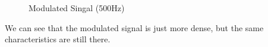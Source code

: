 \documentclass[12pt]{article}
\begin{document}
\begin{figure}[H]
    \centering
    \caption{Modulated Singal (500Hz)}
\end{figure}
We can see that the modulated signal is just more dense, but the same characteristics are still there.
\end{document}
